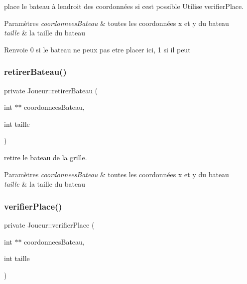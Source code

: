 place le bateau à l\textquotesingle{}endroit des coordonnées si c\textquotesingle{}est possible Utilise verifier\+Place. 


\begin{DoxyParams}{Paramètres}
{\em coordonnees\+Bateau} & toutes les coordonnées x et y du bateau \\
\hline
{\em taille} & la taille du bateau \\
\hline
\end{DoxyParams}
\begin{DoxyReturn}{Renvoie}
0 si le bateau ne peux pas etre placer ici, 1 si il peut 
\end{DoxyReturn}
\mbox{\label{class_joueur_acb9b4b6a2cbf4068ac456e7aba786caf}} 
\subsubsection{\texorpdfstring{retirer\+Bateau()}{retirerBateau()}}
{\footnotesize\ttfamily private Joueur\+::retirer\+Bateau (\begin{DoxyParamCaption}\item[{int $\ast$$\ast$}]{coordonnees\+Bateau,  }\item[{int}]{taille }\end{DoxyParamCaption})\hspace{0.3cm}{\ttfamily [private]}}



retire le bateau de la grille. 


\begin{DoxyParams}{Paramètres}
{\em coordonnees\+Bateau} & toutes les coordonnées x et y du bateau \\
\hline
{\em taille} & la taille du bateau \\
\hline
\end{DoxyParams}
\mbox{\label{class_joueur_a59dba014d589c53de17a5158989f1a0a}} 
\subsubsection{\texorpdfstring{verifier\+Place()}{verifierPlace()}}
{\footnotesize\ttfamily private Joueur\+::verifier\+Place (\begin{DoxyParamCaption}\item[{int $\ast$$\ast$}]{coordonnees\+Bateau,  }\item[{int}]{taille }\end{DoxyParamCaption})\hspace{0.3cm}{\ttfamily [private]}}



